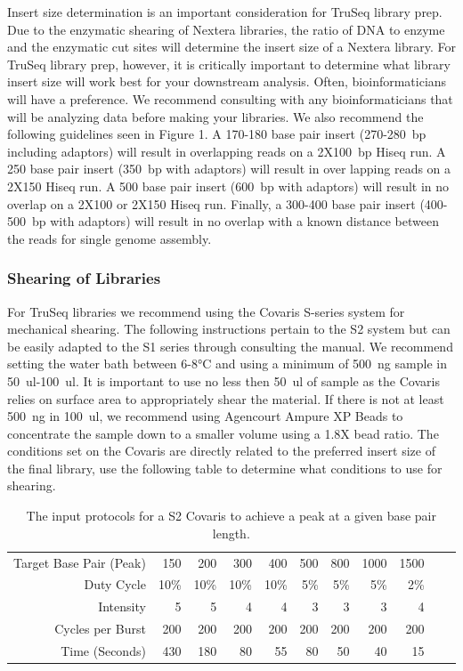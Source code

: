 \documentclass[graybox]{svmult}
\begin{document}
Insert size determination is an important consideration for TruSeq library prep. Due to the enzymatic shearing of Nextera libraries, the ratio of DNA to enzyme and the enzymatic cut sites will determine the insert size of a Nextera library. For TruSeq library prep, however, it is critically important to determine what library insert size will work best for your downstream analysis. Often, bioinformaticians will have a preference. We recommend consulting with any bioinformaticians that will be analyzing data before making your libraries. We also recommend the following guidelines seen in Figure 1. A 170-180 base pair insert (270-280~bp including adaptors) will result in overlapping reads on a 2X100~bp Hiseq run. A 250 base pair insert  (350~bp with adaptors) will result in over lapping reads on a 2X150 Hiseq run. A 500 base pair insert (600~bp with adaptors) will result in no overlap on a 2X100 or 2X150 Hiseq run. Finally, a 300-400 base pair insert (400-500~bp with adaptors) will result in no overlap with a known distance between the reads for single genome assembly.

\subsubsection{Shearing of Libraries}

For TruSeq libraries we recommend using the Covaris S-series system for mechanical shearing. The following instructions pertain to the S2 system but can be easily adapted to the S1 series through consulting the manual.  We recommend setting the water bath between 6-8°C and using a minimum of 500~ng sample in 50~ul-100~ul. It is important to use no less then 50~ul of sample as the Covaris relies on surface area to appropriately shear the material. If there is not at least 500~ng in 100~ul, we recommend using Agencourt Ampure XP Beads to concentrate the sample down to a smaller volume using a 1.8X bead ratio.  The conditions set on the Covaris are directly related to the preferred insert size of the final library, use the following table to determine what conditions to use for shearing.

\begin{table}
\caption{The input protocols for a S2 Covaris to achieve a peak at a given base pair length.}
\begin{tabular}{rrrrrrrrrrr}
Target Base Pair (Peak) & 150 & 200 & 300 & 400 & 500 & 800 & 1000 & 1500  \\
Duty Cycle & 10\% & 10\% & 10\% & 10\% & 5\% & 5\% & 5\% & 2\%  \\
Intensity & 5 & 5 & 4 & 4 & 3 & 3 & 3 & 4  \\
Cycles per Burst & 200 & 200 & 200 & 200 & 200 & 200 & 200 & 200  \\
Time (Seconds) & 430 & 180 & 80 & 55 & 80 & 50 & 40 & 15  \\
\end{tabular}
\end{table}
\end{document}
